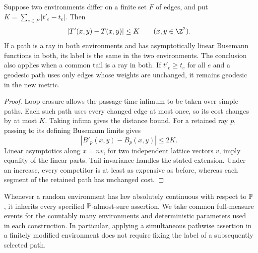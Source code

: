 \begin{lemma}\label{lem:finite-change}
Suppose two environments differ on a finite set \(F\) of edges, and put
\(K=\sum_{e\in F}|t'_e-t_e|\). Then
\[
 |T'(x,y)-T(x,y)|\le K\qquad(x,y\in\Z^2).
\]
If a path is a ray in both environments and has asymptotically linear
Busemann functions in both, its label is the same in the two environments.
The conclusion also applies when a common tail is a ray in both.
If \(t'_e\ge t_e\) for all \(e\) and a geodesic path uses only edges
whose weights are unchanged, it remains geodesic in the new metric.
\end{lemma}
\begin{proof}
Loop erasure allows the passage-time infimum to be taken over simple
paths. Each such path uses every changed edge at most once, so its
cost changes by at most \(K\). Taking infima gives the distance bound.
For a retained ray \(p\), passing to its defining Busemann limits gives
\[
 |B'_p(x,y)-B_p(x,y)|\le2K.
\]
Linear asymptotics along \(x=nv\), for two independent lattice vectors
\(v\), imply equality of the linear parts. Tail invariance handles
the stated extension. Under an increase, every competitor is at least
as expensive as before, whereas each segment of the retained path
has unchanged cost.
\end{proof}

Whenever a random environment has law absolutely continuous with respect
to \(\mathbb P\), it inherits every specified \(\mathbb P\)-almost-sure assertion.
We take common full-measure events for the countably many environments
and deterministic parameters used in each construction. In particular,
applying a simultaneous pathwise assertion in a finitely modified
environment does not require fixing the label of a subsequently selected
path.

